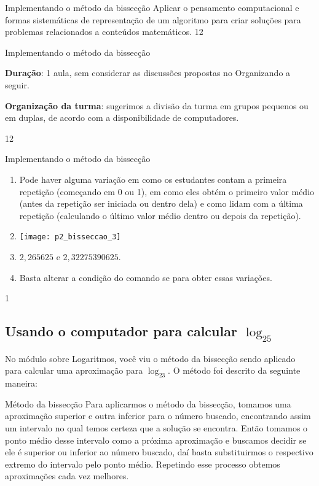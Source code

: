 \clearmargin
\begin{objectives}{Implementando o método da bissecção}
{
Aplicar o pensamento computacional e formas sistemáticas de representação de um algoritmo para criar soluções para problemas relacionados a conteúdos matemáticos.
}{1}{2}
\end{objectives}
\begin{sugestions}{Implementando o método da bissecção}
{
\textbf{Duração}: 1 aula, sem considerar as discussões propostas no Organizando a seguir.

\textbf{Organização da turma}: sugerimos a divisão da turma em grupos pequenos ou em duplas, de acordo com a disponibilidade de computadores.
}{1}{2}
\end{sugestions}
\begin{answer}{Implementando o método da bissecção}
{
\begin{enumerate}
\item Pode haver alguma variação em como os estudantes contam a primeira repetição (começando em 0 ou 1), em como eles obtém o primeiro valor médio (antes da repetição ser iniciada ou dentro dela) e como lidam com a última repetição (calculando o último valor médio dentro ou depois da repetição).

\item {}
{
\texttt{[image: p2\_bisseccao\_3]}
}

\item $2{,}265625$ e $2{,}32275390625$.

\item Basta alterar a condição do comando se para obter essas variações.
\end{enumerate}
}{1}
\end{answer}

\subsection{Usando o computador para calcular $\log_25$}

No módulo sobre Logaritmos, você viu o método da bissecção sendo aplicado para calcular uma aproximação para $\log_23$. O método foi descrito da seguinte maneira:

\begin{observationtitle}{Método da bissecção}
Para aplicarmos o método da bissecção, tomamos uma aproximação superior e outra inferior para o número buscado, encontrando assim um intervalo no qual temos certeza que a solução se encontra. Então tomamos o ponto médio desse intervalo como a próxima aproximação e buscamos decidir se ele é superior ou inferior ao número buscado, daí basta substituirmos o respectivo extremo do intervalo pelo ponto médio. Repetindo esse processo obtemos aproximações cada vez melhores.
\end{observationtitle}

